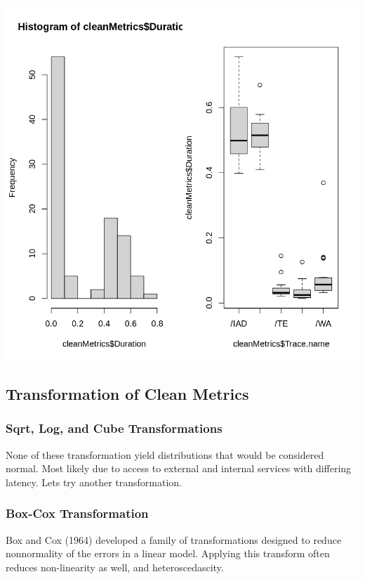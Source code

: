 \documentclass[
  letterpaper,
  DIV=11,
  numbers=noendperiod]{scrartcl}
\begin{document}
\includegraphics{dss-span-analysis-rev1_files/figure-pdf/cell-16-output-1.png}

\hypertarget{transformation-of-clean-metrics}{%
\subsection{Transformation of Clean
Metrics}\label{transformation-of-clean-metrics}}

\hypertarget{sqrt-log-and-cube-transformations}{%
\subsubsection{Sqrt, Log, and Cube
Transformations}\label{sqrt-log-and-cube-transformations}}

None of these transformation yield distributions that would be
considered normal. Most likely due to access to external and internal
services with differing latency. Lets try another transformation.

\hypertarget{box-cox-transformation}{%
\subsubsection{Box-Cox Transformation}\label{box-cox-transformation}}

Box and Cox (1964) developed a family of transformations designed to
reduce nonnormality of the errors in a linear model. Applying this
transform often reduces non-linearity as well, and heteroscedascity.
\end{document}
